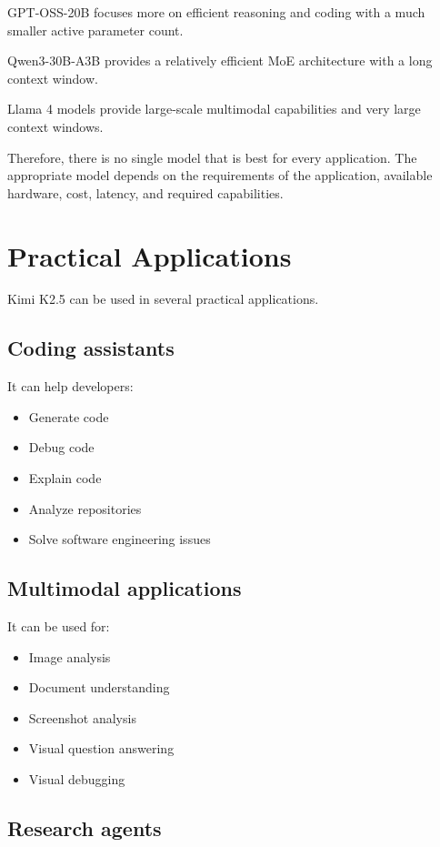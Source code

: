 \documentclass{article}
\begin{document}
GPT-OSS-20B focuses more on efficient reasoning and coding with a much smaller active parameter count.

Qwen3-30B-A3B provides a relatively efficient MoE architecture with a long context window.

Llama 4 models provide large-scale multimodal capabilities and very large context windows.

Therefore, there is no single model that is best for every application. The appropriate model depends on the requirements of the application, available hardware, cost, latency, and required capabilities.

\section{Practical Applications}

Kimi K2.5 can be used in several practical applications.

\subsection{Coding assistants}

It can help developers:

\begin{itemize}
\item Generate code
\item Debug code
\item Explain code
\item Analyze repositories
\item Solve software engineering issues
\end{itemize}

\subsection{Multimodal applications}

It can be used for:

\begin{itemize}
\item Image analysis
\item Document understanding
\item Screenshot analysis
\item Visual question answering
\item Visual debugging
\end{itemize}

\subsection{Research agents}
\end{document}
